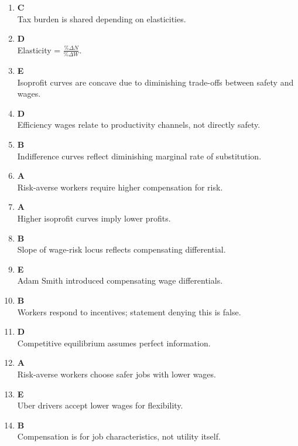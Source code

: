 \documentclass[12pt]{article}
\begin{document}
\begin{enumerate}
\item \textbf{C} \\
Tax burden is shared depending on elasticities.

\item \textbf{D} \\
Elasticity = $\frac{\%\Delta N}{\%\Delta W}$.

\item \textbf{E} \\
Isoprofit curves are concave due to diminishing trade-offs between safety and wages.

\item \textbf{D} \\
Efficiency wages relate to productivity channels, not directly safety.

\item \textbf{B} \\
Indifference curves reflect diminishing marginal rate of substitution.

\item \textbf{A} \\
Risk-averse workers require higher compensation for risk.

\item \textbf{A} \\
Higher isoprofit curves imply lower profits.

\item \textbf{B} \\
Slope of wage-risk locus reflects compensating differential.

\item \textbf{E} \\
Adam Smith introduced compensating wage differentials.

\item \textbf{B} \\
Workers respond to incentives; statement denying this is false.

\item \textbf{D} \\
Competitive equilibrium assumes perfect information.

\item \textbf{A} \\
Risk-averse workers choose safer jobs with lower wages.

\item \textbf{E} \\
Uber drivers accept lower wages for flexibility.

\item \textbf{B} \\
Compensation is for job characteristics, not utility itself.


\end{enumerate}
\end{document}
